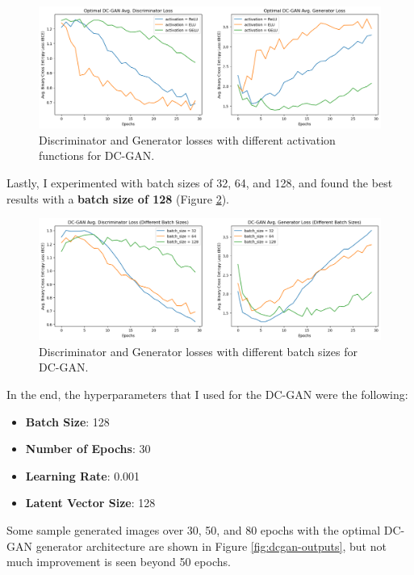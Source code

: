 \documentclass[twoside,11pt]{article}
\begin{document}
\begin{figure}[h!]
  \centering
  \includegraphics[width=16cm]{images/dcgan-experiments/dcgan-activations.png}
  \caption{Discriminator and Generator losses with different activation functions for DC-GAN.}
  \label{fig:dcgan-activations}
\end{figure}

Lastly, I experimented with batch sizes of 32, 64, and 128, and found the best results with a \textbf{batch size of 128} (Figure \ref{fig:dcgan-batchsizes}).

\begin{figure}[h!]
  \centering
  \includegraphics[width=16cm]{images/dcgan-experiments/dcgan-batchsizes.png}
  \caption{Discriminator and Generator losses with different batch sizes for DC-GAN.}
  \label{fig:dcgan-batchsizes}
\end{figure}

\newpage

\noindent In the end, the hyperparameters that I used for the DC-GAN were the following:

\begin{itemize}
  \item \textbf{Batch Size}: 128
  \item \textbf{Number of Epochs}: 30
  \item \textbf{Learning Rate}: 0.001
  \item \textbf{Latent Vector Size}: 128
\end{itemize}

Some sample generated images over 30, 50, and 80 epochs with the optimal DC-GAN generator architecture are shown in Figure \ref{fig:dcgan-outputs}, but not much improvement is seen beyond 50 epochs.
\end{document}
